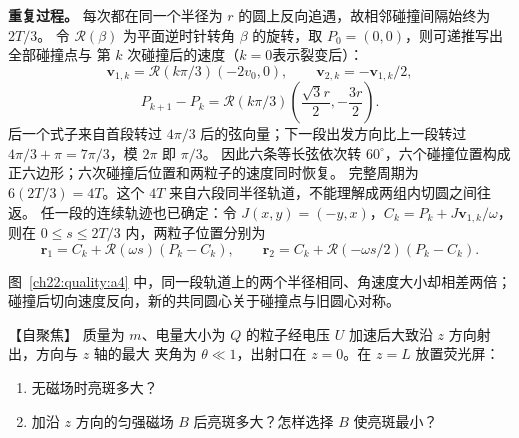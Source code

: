 {\begin{xesolution}
\begin{rTwoFigure}
\end{rTwoFigure}

\textbf{重复过程。} 每次都在同一个半径为 $r$ 的圆上反向追遇，故相邻碰撞间隔始终为 $2T/3$。
令 $\mathcal R(\beta)$ 为平面逆时针转角 $\beta$ 的旋转，取 $P_0=(0,0)$，则可递推写出全部碰撞点与
第 $k$ 次碰撞后的速度（$k=0$表示裂变后）：
\[
 \boldsymbol v_{1,k}=\mathcal R(k\pi/3)(-2v_0,0),\qquad
 \boldsymbol v_{2,k}=-\boldsymbol v_{1,k}/2,
\]
\[
 P_{k+1}-P_k=\mathcal R(k\pi/3)
 \left(\frac{\sqrt3 r}{2},-\frac{3r}{2}\right).
\]
后一个式子来自首段转过 $4\pi/3$ 后的弦向量；下一段出发方向比上一段转过
$4\pi/3+\pi=7\pi/3$，模 $2\pi$ 即 $\pi/3$。
因此六条等长弦依次转 $60^\circ$，六个碰撞位置构成正六边形；六次碰撞后位置和两粒子的速度同时恢复。
完整周期为 $6(2T/3)=\boxed{4T}$。这个 $4T$ 来自六段同半径轨道，不能理解成两组内切圆之间往返。
任一段的连续轨迹也已确定：令 $J(x,y)=(-y,x)$，$C_k=P_k+J\boldsymbol v_{1,k}/\omega$，则在
$0\le s\le2T/3$ 内，两粒子位置分别为
\[
 \boldsymbol r_1=C_k+\mathcal R(\omega s)(P_k-C_k),\qquad
 \boldsymbol r_2=C_k+\mathcal R(-\omega s/2)(P_k-C_k).
\]


图~\ref{ch22:quality:a4} 中，同一段轨道上的两个半径相同、角速度大小却相差两倍；碰撞后切向速度反向，新的共同圆心关于碰撞点与旧圆心对称。
\end{xesolution}



\begin{origexamplebox}{【自聚焦】}\label{ch22:ex:s38-7-5}
质量为 $m$、电量大小为 $Q$ 的粒子经电压 $U$ 加速后大致沿 $z$ 方向射出，方向与 $z$ 轴的最大
夹角为 $\theta\ll1$，出射口在 $z=0$。在 $z=L$ 放置荧光屏：
\begin{enumerate}[label=(\arabic*),leftmargin=2.2em]
  \item 无磁场时亮斑多大？
  \item 加沿 $z$ 方向的匀强磁场 $B$ 后亮斑多大？怎样选择 $B$ 使亮斑最小？
\end{enumerate}

\begin{center}\begin{minipage}{.96\linewidth}\centering
{}
\end{minipage}
\end{center}
\end{origexamplebox}}
